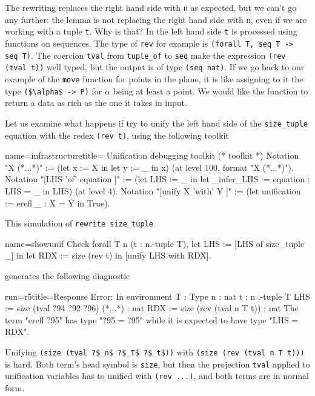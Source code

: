 The rewriting replaces the right hand side with \lstinline/n/ as
expected, but we can't go any further: the lemma is not replacing
the right hand side with \lstinline/n/, even if we are working
with a tuple \lstinline/t/.  Why is that?  In the left hand side
\lstinline/t/ is processed using functions on sequences.
The type of \lstinline/rev/ for example is
\lstinline/(forall T, seq T -> seq T)/.  The coercion \lstinline/tval/
from \lstinline/tuple_of/ to \lstinline/seq/ make the
expression \lstinline/(rev (tval t))/ well typed, but the output
is of type \lstinline/(seq nat)/.  If we go back to our example
of the \lstinline/move/ function for points in the plane, it is like
assigning to it the type \lstinline/($\alpha$ -> P)/ for $\alpha$
being at least a point.  We would like the function to return
a data as rich as the one it takes in input.

Let us examine what happens if try to unify the left hand side of the
\lstinline/size_tuple/ equation with the redex
\lstinline/(rev t)/, using the following toolkit

\begin{coq}{name=infrastructure}{title= Unification debugging toolkit}
(* toolkit *)
Notation "X (*...*)" := (let x := X in let y := _ in x)
  (at level 100, format "X  (*...*)").
Notation "[LHS 'of' equation ]" :=
  (let LHS := _ in
   let _infer_LHS := equation : LHS = _ in LHS)
  (at level 4).
Notation "[unify X 'with' Y ]" :=
  (let unification := erefl _ : X = Y in
   True).
\end{coq}

This simulation of \lstinline/rewrite size_tuple/

\begin{coq}{name=showunif}{}
Check forall T n (t : n.-tuple T),
 let LHS := [LHS of size_tuple _] in
 let RDX := size (rev t) in
 [unify LHS with RDX].
\end{coq}

generates the following diagnostic

\begin{coqout}{run=r5}{title=Response}
Error:
In environment
T : Type
n : nat
t : n .-tuple T
LHS := size (tval ?94 ?92 ?96) (*...*) : nat
RDX := size (rev (tval n T t))           : nat
The term "erefl ?95" has type "?95 = ?95" while
it is expected to have type "LHS = RDX".
\end{coqout}

Unifying \lstinline/(size (tval ?$_n$ ?$_T$ ?$_t$))/
with \lstinline/(size (rev (tval n T t)))/ is hard.
Both term's head symbol is \lstinline/size/, but then
the projection \lstinline/tval/ applied to unification
variables has to unified with \lstinline/(rev ...)/,
and both terms are in normal form.

